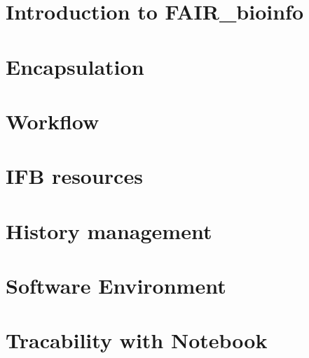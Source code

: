 \documentclass{beamer}
\newcommand\FAIRB{FAIR{\_}bioinfo}
\begin{document}
\label{Introduction}
\section[Introduction]{Introduction to \FAIRB}

\label{Encapsulation}
\section[Encapsulation]{Encapsulation}

\label{Workflow}
\section[Pipeline]{Workflow}

\label{IFB}
\section[IFB]{IFB resources}

\label{History}
\section[History]{History management}

\label{Software_Environment}
\section[Environment]{Software Environment}

\label{Notebooks}
\section{Tracability with Notebook}

\label{Sharing}
\end{document}
